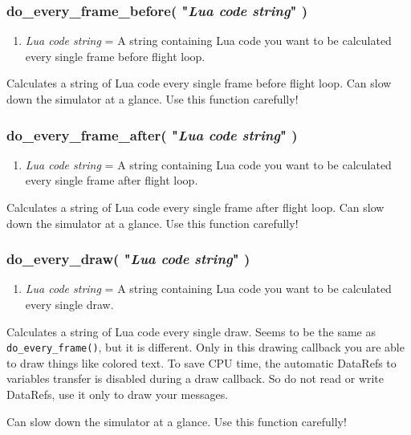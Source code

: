 \documentclass[11pt,parskip=half,a4paper]{scrartcl}
\begin{document}
\subsubsection{do\_every\_frame\_before( "\emph{Lua code string}" )}

\begin{enumerate}
	\item \emph{Lua code string} = A string containing Lua code you want to be calculated every single frame before flight loop.
\end{enumerate}

Calculates a string of Lua code every single frame before flight loop. Can slow down the simulator at a glance. Use this function carefully!

\subsubsection{do\_every\_frame\_after( "\emph{Lua code string}" )}

\begin{enumerate}
	\item \emph{Lua code string} = A string containing Lua code you want to be calculated every single frame after flight loop.
\end{enumerate}

Calculates a string of Lua code every single frame after flight loop. Can slow down the simulator at a glance. Use this function carefully!


\subsubsection{do\_every\_draw( "\emph{Lua code string}" )}

\begin{enumerate}
	\item \emph{Lua code string} = A string containing Lua code you want to be calculated every single draw.
\end{enumerate}

Calculates a string of Lua code every single draw. Seems to be the same as \verb|do_every_frame()|, but it is different. Only in this drawing callback you are able to draw things like colored text. To save CPU time, the automatic DataRefs to variables transfer is disabled during a draw callback. So do not read or write DataRefs, use it only to draw your messages.

Can slow down the simulator at a glance. Use this function carefully!
\end{document}
